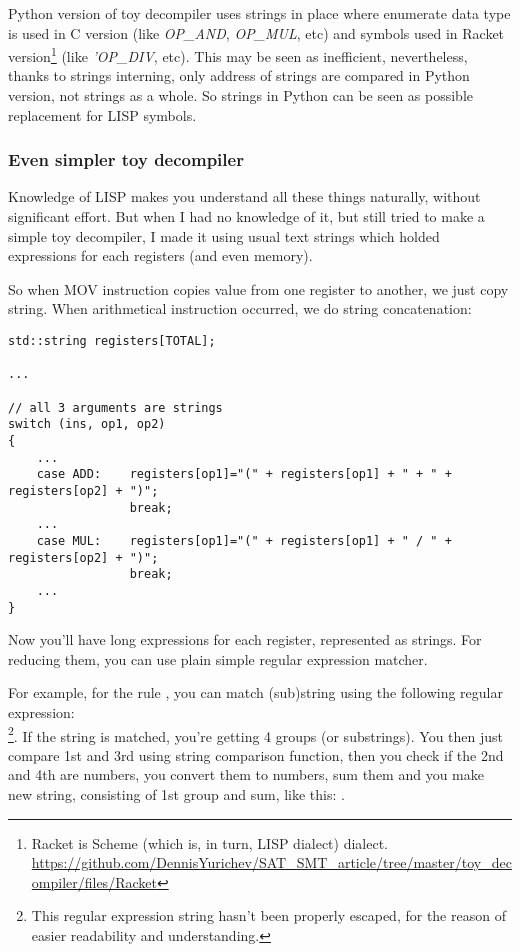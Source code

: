 Python version of toy decompiler uses strings in place where enumerate data type is used in C version
(like \textit{OP\_AND}, \textit{OP\_MUL}, etc) and
symbols used in Racket version\footnote{Racket is Scheme (which is, in turn, LISP dialect) dialect.
\url{https://github.com/DennisYurichev/SAT_SMT_article/tree/master/toy_decompiler/files/Racket}} (like \textit{'OP\_DIV}, etc).
This may be seen as inefficient, nevertheless, thanks to strings interning, only address of strings are compared in
Python version, not strings as a whole. So strings in Python can be seen as possible replacement for LISP symbols.

\subsubsection{Even simpler toy decompiler}

Knowledge of LISP makes you understand all these things naturally, without significant effort.
But when I had no knowledge of it, but still tried to make a simple toy decompiler, I made it using usual text strings
which holded expressions for each registers (and even memory).

So when MOV instruction copies value from one register to another, we just copy string.
When arithmetical instruction occurred, we do string concatenation:

\begin{lstlisting}
std::string registers[TOTAL];

...

// all 3 arguments are strings
switch (ins, op1, op2)
{
    ...
    case ADD:    registers[op1]="(" + registers[op1] + " + " + registers[op2] + ")";
                 break;
    ...
    case MUL:    registers[op1]="(" + registers[op1] + " / " + registers[op2] + ")";
                 break;
    ...
}
\end{lstlisting}

Now you'll have long expressions for each register, represented as strings.
For reducing them, you can use plain simple regular expression matcher.

For example, for the rule , you can match (sub)string using the following
regular expression: \\
\footnote{This regular expression string hasn't been properly escaped,
for the reason of easier readability and understanding.}.
If the string is matched, you're getting 4 groups (or substrings).
You then just compare 1st and 3rd using string comparison function, then you check if
the 2nd and 4th are numbers, you convert them to numbers, sum them and you make new string, consisting
of 1st group and sum, like this: .

